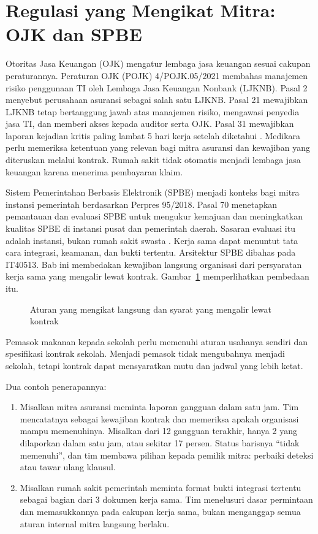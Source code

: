 \section{Regulasi yang Mengikat Mitra: OJK dan SPBE}

Otoritas Jasa Keuangan (OJK) mengatur lembaga jasa keuangan sesuai cakupan peraturannya. Peraturan OJK
(POJK) 4/POJK.05/2021 membahas manajemen risiko penggunaan TI oleh Lembaga Jasa Keuangan Nonbank (LJKNB).
Pasal 2 menyebut perusahaan asuransi sebagai salah satu LJKNB. Pasal 21 mewajibkan LJKNB tetap bertanggung
jawab atas manajemen risiko, mengawasi penyedia jasa TI, dan memberi akses kepada auditor serta OJK. Pasal
31 mewajibkan laporan kejadian kritis paling lambat 5 hari kerja setelah diketahui \cite{c03-pojk4}.
Medikara perlu memeriksa ketentuan yang relevan bagi mitra asuransi dan kewajiban yang diteruskan melalui
kontrak. Rumah sakit tidak otomatis menjadi lembaga jasa keuangan karena menerima pembayaran klaim.

Sistem Pemerintahan Berbasis Elektronik (SPBE) menjadi konteks bagi mitra instansi pemerintah berdasarkan
Perpres 95/2018. Pasal 70 menetapkan pemantauan dan evaluasi SPBE untuk mengukur kemajuan dan meningkatkan
kualitas SPBE di instansi pusat dan pemerintah daerah. Sasaran evaluasi itu adalah instansi, bukan rumah sakit swasta
\cite{perpres95-2018-spbe}. Kerja sama dapat menuntut tata cara integrasi, keamanan, dan bukti tertentu.
Arsitektur SPBE dibahas pada IT40513. Bab ini membedakan kewajiban langsung organisasi dari persyaratan
kerja sama yang mengalir lewat kontrak. Gambar~\ref{fig:ch03-aliran-mitra} memperlihatkan pembedaan itu.

\begin{figure}[!htb]
  \centering
  
  \caption{Aturan yang mengikat langsung dan syarat yang mengalir lewat kontrak}
  \label{fig:ch03-aliran-mitra}
\end{figure}

Pemasok makanan kepada sekolah perlu memenuhi aturan usahanya sendiri dan spesifikasi kontrak sekolah.
Menjadi pemasok tidak mengubahnya menjadi sekolah, tetapi kontrak dapat mensyaratkan mutu dan jadwal yang
lebih ketat.

Dua contoh penerapannya:
\begin{enumerate}
  \item Misalkan mitra asuransi meminta laporan gangguan dalam satu jam. Tim mencatatnya sebagai kewajiban
  kontrak dan memeriksa apakah organisasi mampu memenuhinya. Misalkan dari 12 gangguan terakhir, hanya 2 yang
  dilaporkan dalam satu jam, atau sekitar 17 persen. Status barisnya ``tidak memenuhi'', dan tim membawa
  pilihan kepada pemilik mitra: perbaiki deteksi atau tawar ulang klausul.
  \item Misalkan rumah sakit pemerintah meminta format bukti integrasi tertentu sebagai bagian dari 3
  dokumen kerja sama. Tim menelusuri dasar permintaan dan memasukkannya pada cakupan kerja sama, bukan
  menganggap semua aturan internal mitra langsung berlaku.
\end{enumerate}

